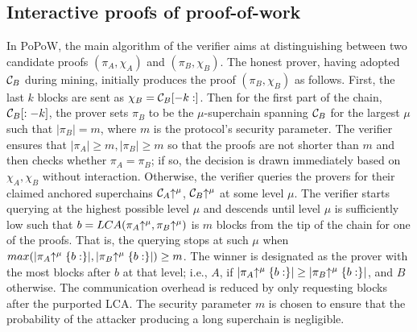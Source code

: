 \subsection{Interactive proofs of proof-of-work}
In PoPoW, the main algorithm of the verifier aims at distinguishing between two
candidate proofs $(\pi_A, \chi_A)$ and $(\pi_B, \chi_B)$. The honest prover,
having adopted $\mathcal{C}_B$ during mining, initially produces the proof $(\pi_B,
\chi_B)$ as follows. First, the last $k$ blocks are sent as $\chi_B =
\mathcal{C}_B[-k:]$. Then for the first part of the chain, $\mathcal{C}_B[:-k]$, the
prover sets $\pi_B$ to be the $\mu$-superchain spanning $\mathcal{C}_B$ for the
largest $\mu$ such that $|\pi_B| = m$, where $m$ is the protocol's security
parameter. The verifier ensures that $|\pi_A| \geq m, |\pi_B| \geq m$ so that
the proofs are not shorter than $m$ and then checks whether $\pi_A = \pi_B$; if
so, the decision is drawn immediately based on $\chi_A,\chi_B$ without
interaction. Otherwise, the verifier queries the provers for their claimed
anchored superchains $\mathcal{C}_A\negthickspace\uparrow^\mu$, $\mathcal{C}_B\negthickspace\uparrow^\mu$ at some
level $\mu$. The verifier starts querying at the highest possible level $\mu$
and descends until level $\mu$ is sufficiently low such that $b =
LCA(\pi_A\negthickspace\uparrow^\mu, \pi_B\negthickspace\uparrow^\mu)$ is $m$ blocks from the tip of the
chain for one of the proofs. That is, the querying stops at such $\mu$ when
$max(|\pi_A\negthickspace\uparrow^\mu\{b:\}|, |\pi_B\negthickspace\uparrow^\mu\{b:\}|) \geq m$. The winner
is designated as the prover with the most blocks after $b$ at that level; i.e.,
$A$, if $|\pi_A\negthickspace\uparrow^\mu\{b:\}| \geq |\pi_B\negthickspace\uparrow^\mu\{b:\}|$, and $B$
otherwise. The communication overhead is reduced by only requesting blocks after
the purported LCA. The security parameter $m$ is chosen to ensure
that the probability of the attacker producing a long superchain is negligible.

